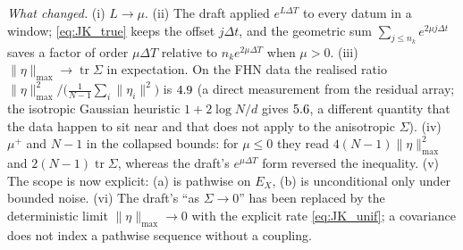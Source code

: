 \documentclass[11pt]{article}
\theoremstyle{remark}\newtheorem{remark}{Remark}
\newcommand{\norm}[1]{\lVert #1\rVert}
\begin{document}
\emph{What changed.} (i) $L\to\mu$. (ii) The draft applied $e^{L\Delta T}$ to every datum in a window; \eqref{eq:JK_true} keeps the offset $j\Delta t$, and the geometric sum $\sum_{j\le n_k}e^{2\mu j\Delta t}$ saves a factor of order $\mu\Delta T$ relative to $n_ke^{2\mu\Delta T}$ when $\mu>0$. (iii) $\norm\eta_{\max}\to\operatorname{tr}\Sigma$ in expectation. On the FHN data the realised ratio $\norm\eta_{\max}^2/\big(\tfrac1{N-1}\sum_i\norm{\eta_i}^2\big)$ is $4.9$ (a direct measurement from the residual array; the isotropic Gaussian heuristic $1+2\log N/d$ gives $5.6$, a different quantity that the data happen to sit near and that does not apply to the anisotropic $\Sigma$). (iv) $\mu^{+}$ and $N-1$ in the collapsed bounds: for $\mu\le0$ they read $4(N-1)\norm\eta_{\max}^2$ and $2(N-1)\operatorname{tr}\Sigma$, whereas the draft's $e^{\mu\Delta T}$ form reversed the inequality. (v) The scope is now explicit: (a) is pathwise on $E_X$, (b) is unconditional only under bounded noise. (vi) The draft's ``as $\Sigma\to0$'' has been replaced by the deterministic limit $\norm\eta_{\max}\to0$ with the explicit rate \eqref{eq:JK_unif}; a covariance does not index a pathwise sequence without a coupling.
\end{document}

